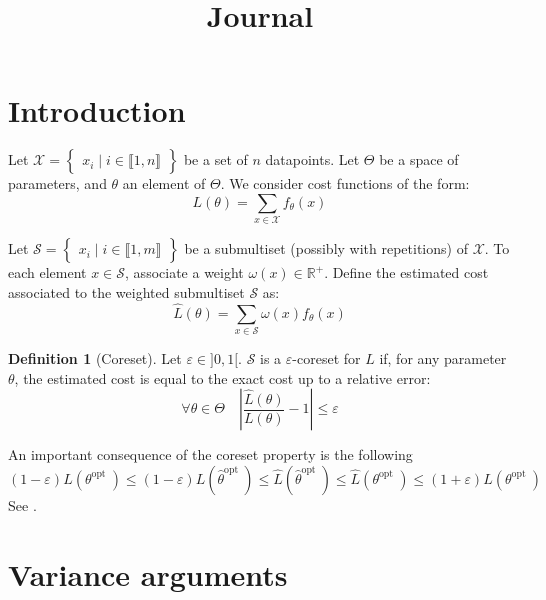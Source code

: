 \documentclass{article} %
\title{Journal}
\renewcommand{\epsilon}{\varepsilon}
\newcommand{\1}{\mathds{1}} %
\newcommand{\intint}[2]{\llbracket #1,#2 \rrbracket} %
\theoremstyle{definition} %
\newtheorem{definition}{Definition}[section]
\begin{document}
	
	\maketitle
	
	\section{Introduction}
	
	Let $\mathcal{X}=\begin{Bmatrix}
		x_{i} \mid i\in \intint{1}{n}
	\end{Bmatrix}$ be a set of $n$ datapoints. Let $\Theta$ be a space of parameters, and $\theta$ an element of $\Theta$. We consider cost functions of the form:
	$$
	L(\theta)=\sum_{x \in \mathcal{X}} f_\theta(x)
	$$
	
	Let $\mathcal{S}=\begin{Bmatrix}
		x_{i} \mid i\in \intint{1}{m}
	\end{Bmatrix}$ be a submultiset (possibly with repetitions) of $\mathcal{X}$. To each element $x \in \mathcal{S}$, associate a weight $\omega\left(x\right) \in \mathbb{R}^{+}$. Define the estimated cost associated to the weighted submultiset $\mathcal{S}$ as:
	$$
	\hat{L}(\theta)=\sum_{x \in \mathcal{S}} \omega\left(x\right) f_\theta(x)
	$$
	\begin{definition}[Coreset]
			Let $\epsilon \in {]}0,1{[}$. $\mathcal{S}$ is a $\epsilon$-coreset for $L$ if, for any parameter $\theta$, the estimated cost is equal to the exact cost up to a relative error:
		\begin{equation}
			\forall \theta \in \Theta \quad\left|\frac{\hat{L}(\theta)}{L(\theta)}-1\right| \le \epsilon 
		\end{equation}
		\label{coresetprop}
	\end{definition}

An important consequence of the coreset property is the following
\begin{equation}
	(1-\epsilon) L\left(\theta^{\text {opt }}\right) \le(1-\epsilon) L\left( \hat{\theta}^{\text {opt }}\right) \le \hat{L}\left( \hat{\theta}^{\text {opt }}\right) \le \hat{L}\left( \theta^{\text {opt }}\right) \le(1+\epsilon) L\left( \theta^{\text {opt }}\right)
\end{equation}
See \cite{bachem2017coresetML}.

\section{Variance arguments}
\end{document}
